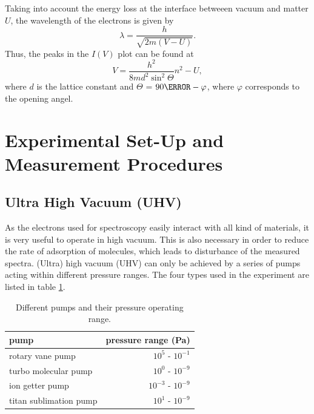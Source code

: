 \documentclass[a4paper]{scrartcl}
\numberwithin{equation}{section}
\numberwithin{figure}{section}
\numberwithin{table}{section}
\newcommand{\eq}[2]{\begin{equation}#1\label{#2}\end{equation}}
\begin{document}
Taking into account the energy loss at the interface betweeen vacuum and matter $U$, the wavelength of the electrons is given by
\eq{\lambda = \frac{h}{\sqrt{2m(V-U)}}.}{lshift}
Thus, the peaks in the $I(V)$ plot can be found at
\eq{V=\frac{h^2}{8md^2 \sin^2 \Theta }n^2-U,}{eq:iv}
where $d$ is the lattice constant and $\Theta$ = $90\degree - \varphi$, where $\varphi$ corresponds to the opening angel. 

\clearpage
\section{Experimental Set-Up and Measurement Procedures}
\FloatBarrier
\subsection{Ultra High Vacuum (UHV)}
As the electrons used for spectroscopy easily interact with all kind of materials, it is very useful to operate in high vacuum. This is also necessary in order to reduce the rate of adsorption of molecules, which leads to disturbance of the measured spectra. (Ultra) high  vacuum (UHV) can only be achieved by a series of pumps acting within different pressure ranges. The four types used in the experiment are listed in table \ref{tab:pump}.
\begin{table}
\begin{tabular}{lr}
\toprule
pump & pressure range (Pa)\\
\midrule
\small rotary vane pump & $10^5$ - $10^{-1}$  \\ 
\small turbo molecular pump &  $10^0$  - $10^{-9}$  \\
\small ion getter pump  & $ 10^{-3}$  - $10^{-9}$  \\
\small titan sublimation pump & $10^1$  - $10^{-9}$  \\
\bottomrule
\end{tabular}
\caption{Different pumps and their pressure operating range. \cite{gop} }
\label{tab:pump}
\end{table}
\end{document}

